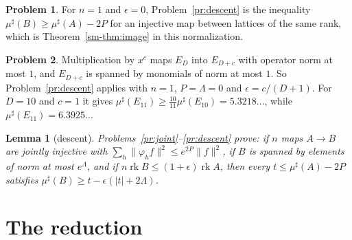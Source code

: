 \documentclass[reqno]{amsart}
\theoremstyle{definition}
\newtheorem{problem}{Problem}[section]
\theoremstyle{plain}
\newtheorem{lemma}[theorem]{Lemma}
\theoremstyle{remark}
\newcommand{\rk}{\operatorname{rk}}
\newcommand{\mus}{\mu^\sharp}
\begin{document}
\begin{problem}\label{pr:descent-bost}
For \(n = 1\) and \(\epsilon = 0\), Problem~\ref{pr:descent} is the inequality \(\mus(B) \ge \mus(A) - 2P\) for an injective map between lattices of the same rank, which is Theorem~\ref{sm-thm:image} in this normalization.
\end{problem}

\begin{problem}\label{pr:descent-P1}
Multiplication by \(x^c\) maps \(E_D\) into \(E_{D+c}\) with operator norm at most \(1\), and \(E_{D+c}\) is spanned by monomials of norm at most \(1\).  So Problem~\ref{pr:descent} applies with \(n = 1\), \(P = \Lambda = 0\) and \(\epsilon = c/(D+1)\).  For \(D = 10\) and \(c = 1\) it gives \(\mus(E_{11}) \ge \frac{10}{11}\mus(E_{10}) = 5.3218\ldots\), while \(\mus(E_{11}) = 6.3925\ldots\)
\end{problem}

\begin{lemma}[descent]\label{lem:descent}
Problems~\ref{pr:joint}--\ref{pr:descent} prove: if \(n\) maps \(A \to B\) are jointly injective with \(\sum_h\lVert\varphi_hf\rVert^2 \le e^{2P}\lVert f\rVert^2\), if \(B\) is spanned by elements of norm at most \(e^\Lambda\), and if \(n\rk B \le (1+\epsilon)\rk A\), then every \(t \le \mus(A) - 2P\) satisfies \(\mus(B) \ge t - \epsilon(\lvert t\rvert + 2\Lambda)\).
\end{lemma}

\section{The reduction}\label{sec:reduction}
\end{document}
